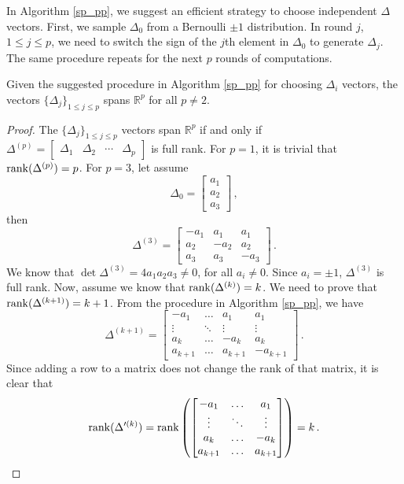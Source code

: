 In Algorithm \ref{sp_pp}, we suggest an efficient strategy to choose independent $\Delta$ vectors. First, we sample $\Delta_0$ from a Bernoulli $\pm 1$ distribution. In round $j$, $1 \leq j \leq p$, we need to switch the sign of the $j$th element in $\Delta_{0}$ to generate $\Delta_{j}$. The same procedure repeats for the next $p$ rounds of computations.

\begin{lemma}
Given the suggested procedure in Algorithm \ref{sp_pp} for choosing $\Delta_i$ vectors, the vectors $\{\Delta_j\}_{1\leq j\leq p}$ spans $\mathbb{R}^p$ for all $p\neq 2$.
\end{lemma}

\begin{proof}
The $\{\Delta_j\}_{1\leq j\leq p}$ vectors span $\mathbb{R}^p$ if and only if $\Delta^{(p)} = \begin{bmatrix} \Delta_1& \Delta_2& \cdots& \Delta_p \end{bmatrix}$ is full rank.
For $p=1$, it is trivial that $\operatorname{rank}(\Delta^{(p)})=p$. For $p=3$, let assume 
$$ \Delta_0 = \begin{bmatrix} a_1 \\ a_2 \\ a_3 \end{bmatrix}\,,$$
then
$$ \Delta^{(3)} = \begin{bmatrix} -a_1 & a_1 & a_1 \\ a_2 &-a_2 & a_2\\ a_3&a_3 & -a_3 \end{bmatrix}\,.$$
We know that $\det{\Delta^{(3)}}=4a_1a_2a_3 \neq 0$, for all $a_i\neq 0$. Since $a_i=\pm1$, $\Delta^{(3)}$ is full rank. Now, assume we know that $\operatorname{rank}(\Delta^{(k)})=k$. We need to prove that $\operatorname{rank}(\Delta^{(k+1)})=k+1$. From the procedure in Algorithm \ref{sp_pp}, we have
$$ \Delta^{(k+1)} = \begin{bmatrix} -a_1 & \hdots & a_1& a_1 \\ \vdots &\ddots & \vdots & \vdots \\ a_k &\hdots & -a_k & a_k \\ a_{k+1}& \hdots & a_{k+1}& -a_{k+1} \end{bmatrix}\,.$$
Since adding a row to a matrix does not change the rank of that matrix, it is clear that 
$$ \operatorname{rank}(\Delta^{\prime(k)})= \operatorname{rank} \left( \begin{bmatrix} -a_1 & \hdots & a_1 \\ \vdots &\ddots & \vdots \\ a_k&\hdots & -a_k\\ a_{k+1}& \hdots & a_{k+1} \end{bmatrix} \right) = k \,.$$

\end{proof}
